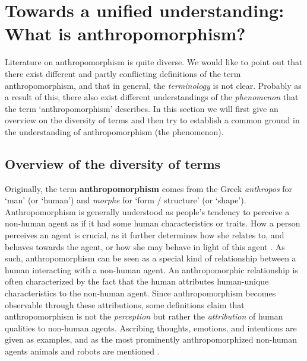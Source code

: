 \documentclass{frontiersSCNS} %
\begin{document}
%
%
%
%
%
%

\section{Towards a unified understanding: What is anthropomorphism?}
\label{sec:definitions}

Literature on anthropomorphism is quite diverse. We would like to point out that there exist different and partly conflicting definitions of the term anthropomorphism, and that in general, the \textit{terminology} is not clear. Probably as a result of this, there also exist different understandings of the \textit{phenomenon} that the term `anthropomorphism' describes.
 In this section we will first give an overview on the diversity of terms and then try to establish a common ground in the understanding of anthropomorphism (the phenomenon).


\subsection{Overview of the diversity of terms}

Originally, the term \textbf{anthropomorphism} comes from the Greek \textit{anthropos} for `man' (or `human') and \textit{morphe} for `form / structure' (or `shape'). Anthropomorphism is generally understood as people's tendency to perceive a non-human agent as if it had some human characteristics or traits. How a person perceives an agent is crucial, as it further determines how she relates to, and behaves towards the agent, or how she may behave in light of this agent \citep{epley_when_2008}.
As such, anthropomorphism can be seen as a special kind of relationship between a human interacting with a non-human agent. An anthropomorphic relationship is often characterized by the fact that the human attributes human-unique characteristics to the non-human agent. Since anthropomorphism becomes observable through these attributions, some definitions claim that anthropomorphism is not the \textit{perception} but rather the \textit{attribution} of human qualities to non-human agents. Ascribing thoughts, emotions, and intentions are given as examples, and as the most prominently anthropomorphized non-human agents animals and robots are mentioned \citep{duffy_anthropomorphism_2003,schmitz_concepts_2011}.
\end{document}
